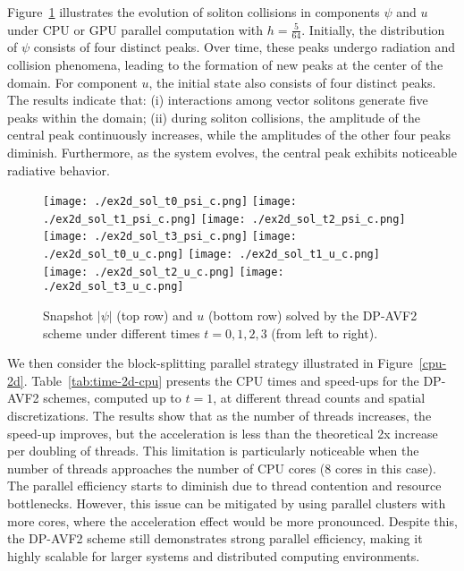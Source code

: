 \documentclass[fleqn,11pt]{elsarticle}
\numberwithin{equation}{section}
\begin{document}
Figure~\ref{plot2d} illustrates the evolution of soliton collisions in components $\psi$ and $u$ under CPU or GPU parallel computation with $h = \frac{5}{64}$. Initially, the distribution of $\psi$ consists of four distinct peaks. Over time, these peaks undergo radiation and collision phenomena, leading to the formation of new peaks at the center of the domain. For component $u$, the initial state also consists of four distinct peaks. The results indicate that: (i) interactions among vector solitons generate five peaks within the domain; (ii) during soliton collisions, the amplitude of the central peak continuously increases, while the amplitudes of the other four peaks diminish. Furthermore, as the system evolves, the central peak exhibits noticeable radiative behavior.


\begin{figure}[H]
	\centering
		\texttt{[image: ./ex2d\_sol\_t0\_psi\_c.png]}
		\texttt{[image: ./ex2d\_sol\_t1\_psi\_c.png]}
		\texttt{[image: ./ex2d\_sol\_t2\_psi\_c.png]}
		\texttt{[image: ./ex2d\_sol\_t3\_psi\_c.png]}
		\texttt{[image: ./ex2d\_sol\_t0\_u\_c.png]}
		\texttt{[image: ./ex2d\_sol\_t1\_u\_c.png]}
		\texttt{[image: ./ex2d\_sol\_t2\_u\_c.png]}
		\texttt{[image: ./ex2d\_sol\_t3\_u\_c.png]}
	\caption{Snapshot $|\psi|$ (top row) and $u$ (bottom row) solved by the DP-AVF2 scheme under different times $t = 0, 1, 2, 3$ (from left to right).}\label{plot2d}
\end{figure}


We then consider the block-splitting parallel strategy illustrated in Figure~\ref{cpu-2d}. Table~\ref{tab:time-2d-cpu} presents the CPU times and speed-ups for the DP-AVF2 schemes, computed up to $t = 1$, at different thread counts and spatial discretizations. The results show that as the number of threads increases, the speed-up improves, but the acceleration is less than the theoretical 2x increase per doubling of threads. This limitation is particularly noticeable when the number of threads approaches the number of CPU cores (8 cores in this case). The parallel efficiency starts to diminish due to thread contention and resource bottlenecks. However, this issue can be mitigated by using parallel clusters with more cores, where the acceleration effect would be more pronounced. Despite this, the DP-AVF2 scheme still demonstrates strong parallel efficiency, making it highly scalable for larger systems and distributed computing environments.
\end{document}
